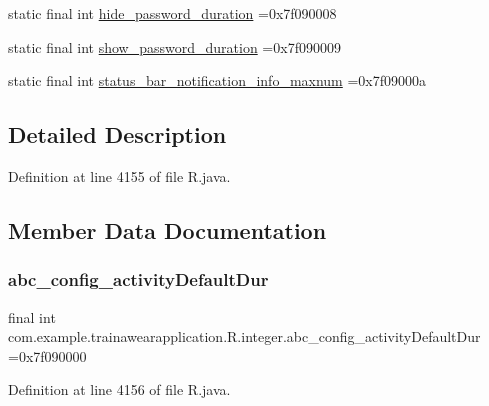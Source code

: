 \begin{DoxyCompactItemize}
\item 
static final int \mbox{\hyperlink{classcom_1_1example_1_1trainawearapplication_1_1_r_1_1integer_af19d9b54af7d930d8f478baf507e204a}{hide\+\_\+password\+\_\+duration}} =0x7f090008
\item 
static final int \mbox{\hyperlink{classcom_1_1example_1_1trainawearapplication_1_1_r_1_1integer_a8b8d4e7c1ea962ec309ce7de5a22f7d3}{show\+\_\+password\+\_\+duration}} =0x7f090009
\item 
static final int \mbox{\hyperlink{classcom_1_1example_1_1trainawearapplication_1_1_r_1_1integer_a4b9201aa0cdb2d6fc17f3d7d13229650}{status\+\_\+bar\+\_\+notification\+\_\+info\+\_\+maxnum}} =0x7f09000a
\end{DoxyCompactItemize}


\subsection{Detailed Description}


Definition at line 4155 of file R.\+java.



\subsection{Member Data Documentation}
\mbox{\label{classcom_1_1example_1_1trainawearapplication_1_1_r_1_1integer_abdf85258af27317fb88ff2a9f0e3d9ce}} 
\subsubsection{\texorpdfstring{abc\_config\_activityDefaultDur}{abc\_config\_activityDefaultDur}}
{\footnotesize\ttfamily final int com.\+example.\+trainawearapplication.\+R.\+integer.\+abc\+\_\+config\+\_\+activity\+Default\+Dur =0x7f090000\hspace{0.3cm}{\ttfamily [static]}}



Definition at line 4156 of file R.\+java.

\mbox{\label{classcom_1_1example_1_1trainawearapplication_1_1_r_1_1integer_a305e6a28be62e9a6de7c17239aedc1ce}} 
